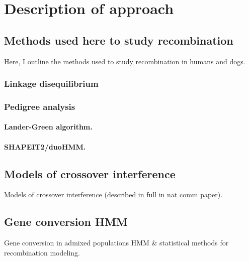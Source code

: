 \section{Description of approach}

\subsection{Methods used here to study recombination}
Here, I outline the methods used to study recombination in humans and dogs.

\subsubsection{Linkage disequilibrium}


\subsubsection{Pedigree analysis}

\paragraph{Lander-Green algorithm.}
\paragraph{SHAPEIT2/duoHMM.}

\subsection{Models of crossover interference}
    Models of crossover interference (described in full in nat comm paper).

\subsection{Gene conversion HMM}
    Gene conversion in admixed populations HMM \& statistical methods for recombination modeling.


\renewcommand{\bibname}{References}
\begingroup
    \setlength{\bibsep}{10pt}
    \linespread{1}\selectfont
    
\endgroup

